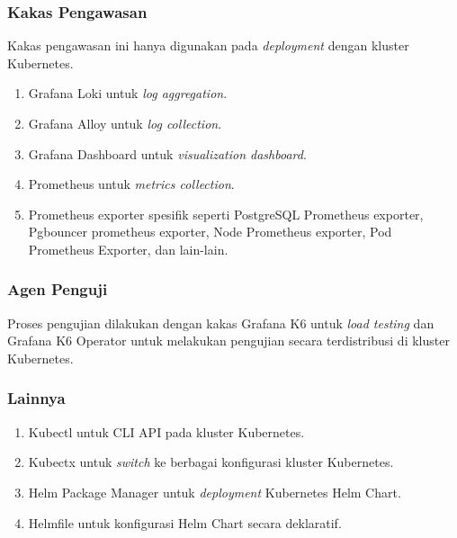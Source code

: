 \subsubsection{Kakas Pengawasan}

Kakas pengawasan ini hanya digunakan pada \textit{deployment} dengan kluster Kubernetes.

\begin{enumerate}
    \item Grafana Loki untuk \textit{log aggregation}.
    \item Grafana Alloy untuk \textit{log collection}.
    \item Grafana Dashboard untuk \textit{visualization dashboard}.
    \item Prometheus untuk \textit{metrics collection}.
    \item Prometheus exporter spesifik seperti PostgreSQL Prometheus exporter, Pgbouncer prometheus exporter, Node Prometheus exporter, Pod Prometheus Exporter, dan lain-lain.
\end{enumerate}

\subsubsection{Agen Penguji}

Proses pengujian dilakukan dengan kakas Grafana K6 untuk \textit{load testing} dan Grafana K6 Operator untuk melakukan pengujian secara terdistribusi di kluster Kubernetes.

\subsubsection{Lainnya}

\begin{enumerate}
    \item Kubectl untuk CLI API pada kluster Kubernetes.
    \item Kubectx untuk \textit{switch} ke berbagai konfigurasi kluster Kubernetes.
    \item Helm Package Manager untuk \textit{deployment} Kubernetes Helm Chart.
    \item Helmfile untuk konfigurasi Helm Chart secara deklaratif.
\end{enumerate}